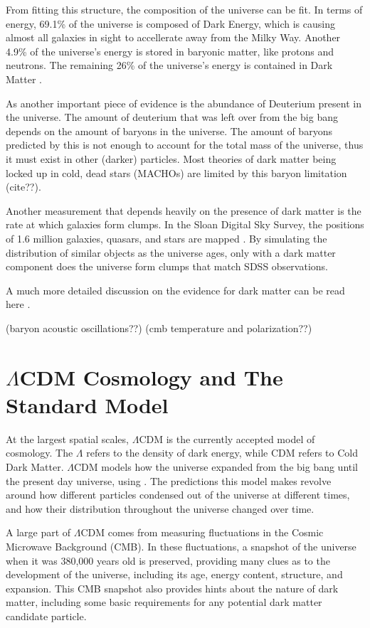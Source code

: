     From fitting this structure, the composition of the universe can be fit.
    In terms of energy, 69.1\% of the universe is composed of Dark Energy, which is causing almost all galaxies in sight to accellerate away from the Milky Way.
    Another 4.9\% of the universe's energy is stored in baryonic matter, like protons and neutrons.
    The remaining 26\% of the universe's energy is contained in Dark Matter \cite{planck2015}.

    As another important piece of evidence is the abundance of Deuterium present in the universe.
    The amount of deuterium that was left over from the big bang depends on the amount of baryons in the universe.
    The amount of baryons predicted by this is not enough to account for the total mass of the universe, thus it must exist in other (darker) particles.
    Most theories of dark matter being locked up in cold, dead stars (MACHOs) are limited by this baryon limitation {\color{red}(cite??)}.

    Another measurement that depends heavily on the presence of dark matter is the rate at which galaxies form clumps.
    In the Sloan Digital Sky Survey, the positions of 1.6 million galaxies, quasars, and stars are mapped \cite{sdss_release}.
    By simulating the distribution of similar objects as the universe ages, only with a dark matter component does the universe form clumps that match SDSS observations.
  
    A much more detailed discussion on the evidence for dark matter can be read here \cite{DMPrimer}.

    {\color{red}(baryon acoustic oscillations??)}
    {\color{red}(cmb temperature and polarization??)}

\section{$\Lambda$CDM Cosmology and The Standard Model}

  At the largest spatial scales, $\Lambda$CDM is the currently accepted model of cosmology.
  The $\Lambda$ refers to the density of dark energy, while CDM refers to Cold Dark Matter.
  $\Lambda$CDM models how the universe expanded from the big bang until the present day universe, using .
  The predictions this model makes revolve around how different particles condensed out of the universe at different times, and how their distribution throughout the universe changed over time.

  A large part of $\Lambda$CDM comes from measuring fluctuations in the Cosmic Microwave Background (CMB).
  In these fluctuations, a snapshot of the universe when it was 380,000 years old is preserved, providing many clues as to the development of the universe, including its age, energy content, structure, and expansion. 
  This CMB snapshot also provides hints about the nature of dark matter, including some basic requirements for any potential dark matter candidate particle.

